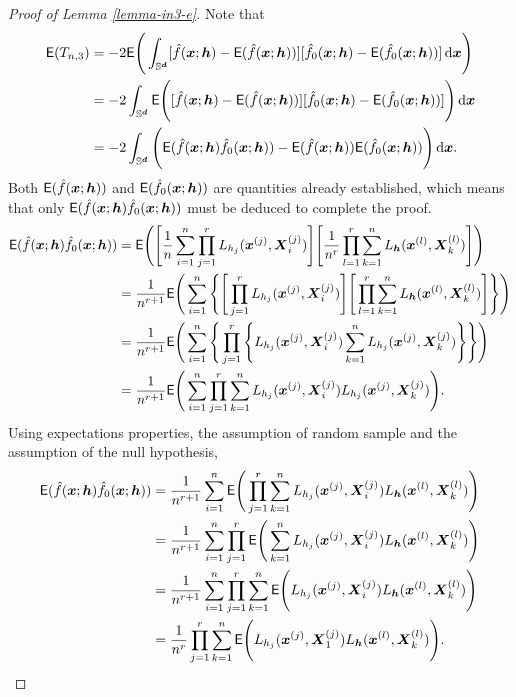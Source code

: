 \documentclass[oneside,11pt]{article}
\begin{document}
\begin{proof}[Proof of Lemma \ref{lemma-in3-e}]
    Note that
    \begin{align*}
        \mathsf{E} (T_{n,3}) &= -2 \mathsf{E} \Bigg( \int_{\mathbb{S}^{\boldsymbol{d}}} [ \hat{f}(\boldsymbol{x};{\boldsymbol{h}}) - \mathsf{E} (\hat{f}(\boldsymbol{x};{\boldsymbol{h}})) ] [ \hat{f}_{0}(\boldsymbol{x};{\boldsymbol{h}}) - \mathsf{E} (\hat{f}_{0}(\boldsymbol{x};{\boldsymbol{h}})) ] \,\mathrm{d} \boldsymbol{x} \Bigg) \\
        &= -2 \int_{\mathbb{S}^{\boldsymbol{d}}} \mathsf{E} \Bigg( [ \hat{f}(\boldsymbol{x};{\boldsymbol{h}}) - \mathsf{E} (\hat{f}(\boldsymbol{x};{\boldsymbol{h}})) ] [ \hat{f}_{0}(\boldsymbol{x};{\boldsymbol{h}}) - \mathsf{E} (\hat{f}_{0}(\boldsymbol{x};{\boldsymbol{h}})) ] \Bigg) \,\mathrm{d} \boldsymbol{x} \\
        &= -2 \int_{\mathbb{S}^{\boldsymbol{d}}}  \Bigg( \mathsf{E} (\hat{f}(\boldsymbol{x};{\boldsymbol{h}}) \hat{f}_{0}(\boldsymbol{x};{\boldsymbol{h}})) - \mathsf{E} (\hat{f}(\boldsymbol{x};{\boldsymbol{h}})) \mathsf{E} (\hat{f}_{0}(\boldsymbol{x};{\boldsymbol{h}}))  \Bigg) \,\mathrm{d} \boldsymbol{x}.
    \end{align*}
    Both $\mathsf{E} (\hat{f}(\boldsymbol{x};{\boldsymbol{h}}))$ and $\mathsf{E} (\hat{f}_{0}(\boldsymbol{x};{\boldsymbol{h}}))$ are quantities already established, which means that only $\mathsf{E} (\hat{f}(\boldsymbol{x};{\boldsymbol{h}}) \hat{f}_{0}(\boldsymbol{x};{\boldsymbol{h}}))$ must be deduced to complete the proof.
    \begin{align*}
        \mathsf{E} (\hat{f}(\boldsymbol{x};{\boldsymbol{h}}) \hat{f}_{0}(\boldsymbol{x};{\boldsymbol{h}})) &= \mathsf{E} \Bigg( \Bigg[ \frac{1}{n} \sum_{i=1}^{n} \prod_{j=1}^{r} L_{h_j} (\boldsymbol{x}^{(j)}, \boldsymbol{X}_i^{(j)}) \Bigg] \Bigg[ \frac{1}{n^r} \prod_{l=1}^{r} \sum_{k=1}^{n} L_{{\boldsymbol{h}}} (\boldsymbol{x}^{(l)}, \boldsymbol{X}_k^{(l)}) \Bigg] \Bigg) \\
        &= \frac{1}{n^{r+1}} \mathsf{E} \Bigg( \sum_{i=1}^{n} \Bigg\{ \Bigg[ \prod_{j=1}^{r} L_{h_j} (\boldsymbol{x}^{(j)}, \boldsymbol{X}_i^{(j)}) \Bigg] \Bigg[ \prod_{l=1}^{r} \sum_{k=1}^{n} L_{{\boldsymbol{h}}} (\boldsymbol{x}^{(l)}, \boldsymbol{X}_k^{(l)}) \Bigg] \Bigg\} \Bigg) \\
        &= \frac{1}{n^{r+1}} \mathsf{E} \Bigg( \sum_{i=1}^{n} \Bigg\{ \prod_{j=1}^{r} \Bigg\{ L_{h_j} (\boldsymbol{x}^{(j)}, \boldsymbol{X}_i^{(j)}) \sum_{k=1}^{n} L_{h_j} (\boldsymbol{x}^{(j)}, \boldsymbol{X}_k^{(j)}) \Bigg\} \Bigg\} \Bigg) \\
        &= \frac{1}{n^{r+1}} \mathsf{E} \Bigg( \sum_{i=1}^{n} \prod_{j=1}^{r} \sum_{k=1}^{n} L_{h_j} (\boldsymbol{x}^{(j)}, \boldsymbol{X}_i^{(j)}) L_{h_j} (\boldsymbol{x}^{(j)}, \boldsymbol{X}_k^{(j)}) \Bigg).
    \end{align*}
Using expectations properties, the assumption of random sample and the assumption of the null hypothesis,
\begin{align*}
    \mathsf{E} (\hat{f}(\boldsymbol{x};{\boldsymbol{h}}) \hat{f}_{0}(\boldsymbol{x};{\boldsymbol{h}})) &= \frac{1}{n^{r+1}} \sum_{i=1}^{n} \mathsf{E} \Bigg( \prod_{j=1}^{r} \sum_{k=1}^{n} L_{h_j} (\boldsymbol{x}^{(j)}, \boldsymbol{X}_i^{(j)}) L_{{\boldsymbol{h}}} (\boldsymbol{x}^{(l)}, \boldsymbol{X}_k^{(l)}) \Bigg) \\
    &= \frac{1}{n^{r+1}} \sum_{i=1}^{n} \prod_{j=1}^{r} \mathsf{E} \Bigg( \sum_{k=1}^{n} L_{h_j} (\boldsymbol{x}^{(j)}, \boldsymbol{X}_i^{(j)}) L_{{\boldsymbol{h}}} (\boldsymbol{x}^{(l)}, \boldsymbol{X}_k^{(l)}) \Bigg) \\
    &= \frac{1}{n^{r+1}} \sum_{i=1}^{n} \prod_{j=1}^{r} \sum_{k=1}^{n} \mathsf{E} \Bigg( L_{h_j} (\boldsymbol{x}^{(j)}, \boldsymbol{X}_i^{(j)}) L_{{\boldsymbol{h}}} (\boldsymbol{x}^{(l)}, \boldsymbol{X}_k^{(l)}) \Bigg) \\
    &= \frac{1}{n^{r}} \prod_{j=1}^{r} \sum_{k=1}^{n} \mathsf{E} \Bigg( L_{h_j} (\boldsymbol{x}^{(j)}, \boldsymbol{X}_1^{(j)}) L_{{\boldsymbol{h}}} (\boldsymbol{x}^{(l)}, \boldsymbol{X}_k^{(l)}) \Bigg).
\end{align*}


\end{proof}
\end{document}
